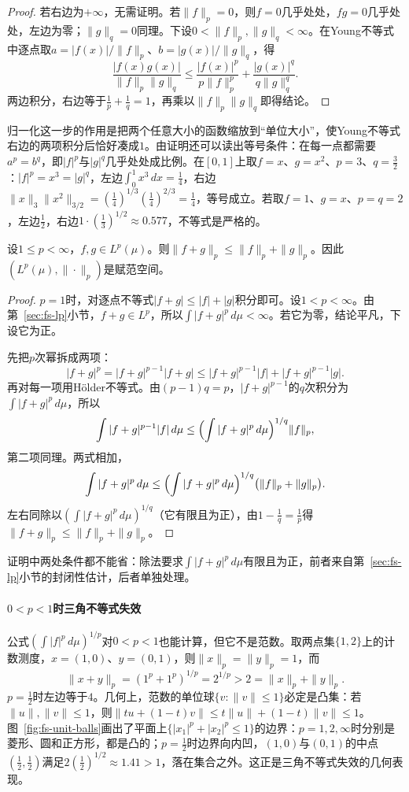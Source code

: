 \begin{proof}
若右边为$+\infty$，无需证明。若$\|f\|_p=0$，则$f=0$几乎处处，$fg=0$几乎处处，左边为零；$\|g\|_q=0$同理。下设$0<\|f\|_p,\|g\|_q<\infty$。在Young不等式中逐点取$a=|f(x)|/\|f\|_p$、$b=|g(x)|/\|g\|_q$，得
\[
 \frac{|f(x)g(x)|}{\|f\|_p\|g\|_q}\leq\frac{|f(x)|^p}{p\|f\|_p^p}+\frac{|g(x)|^q}{q\|g\|_q^q}.
\]
两边积分，右边等于$\tfrac1p+\tfrac1q=1$，再乘以$\|f\|_p\|g\|_q$即得结论。
\end{proof}

归一化这一步的作用是把两个任意大小的函数缩放到“单位大小”，使Young不等式右边的两项积分后恰好凑成$1$。由证明还可以读出等号条件：在每一点都需要$a^p=b^q$，即$|f|^p$与$|g|^q$几乎处处成比例。在$[0,1]$上取$f=x$、$g=x^2$、$p=3$、$q=\tfrac32$：$|f|^p=x^3=|g|^q$，左边$\int_0^1x^3\,dx=\tfrac14$，右边$\|x\|_3\|x^2\|_{3/2}=(\tfrac14)^{1/3}(\tfrac14)^{2/3}=\tfrac14$，等号成立。若取$f=1$、$g=x$、$p=q=2$，左边$\tfrac12$，右边$1\cdot(\tfrac13)^{1/2}\approx0.577$，不等式是严格的。

\begin{theorem}[Minkowski不等式]
\label{thm:fs-minkowski}
设$1\leq p<\infty$，$f,g\in L^p(\mu)$。则$\|f+g\|_p\leq\|f\|_p+\|g\|_p$。因此$(L^p(\mu),\|\cdot\|_p)$是赋范空间。
\end{theorem}

\begin{proof}
$p=1$时，对逐点不等式$|f+g|\leq|f|+|g|$积分即可。设$1<p<\infty$。由第~\ref{sec:fs-lp}小节，$f+g\in L^p$，所以$\int|f+g|^p\,d\mu<\infty$。若它为零，结论平凡，下设它为正。

先把$p$次幂拆成两项：
\[
 |f+g|^p=|f+g|^{p-1}|f+g|\leq|f+g|^{p-1}|f|+|f+g|^{p-1}|g| .
\]
再对每一项用Hölder不等式。由$(p-1)q=p$，$|f+g|^{p-1}$的$q$次积分为$\int|f+g|^p\,d\mu$，所以
\[
 \int|f+g|^{p-1}|f|\,d\mu\leq\Bigl(\int|f+g|^p\,d\mu\Bigr)^{1/q}\|f\|_p ,
\]
第二项同理。两式相加，
\[
 \int|f+g|^p\,d\mu\leq\Bigl(\int|f+g|^p\,d\mu\Bigr)^{1/q}\bigl(\|f\|_p+\|g\|_p\bigr).
\]
左右同除以$(\int|f+g|^p\,d\mu)^{1/q}$（它有限且为正），由$1-\tfrac1q=\tfrac1p$得$\|f+g\|_p\leq\|f\|_p+\|g\|_p$。
\end{proof}

证明中两处条件都不能省：除法要求$\int|f+g|^p\,d\mu$有限且为正，前者来自第~\ref{sec:fs-lp}小节的封闭性估计，后者单独处理。

\paragraph{$0<p<1$时三角不等式失效}
公式$(\int|f|^p\,d\mu)^{1/p}$对$0<p<1$也能计算，但它不是范数。取两点集$\{1,2\}$上的计数测度，$x=(1,0)$、$y=(0,1)$，则$\|x\|_p=\|y\|_p=1$，而
\[
 \|x+y\|_p=(1^p+1^p)^{1/p}=2^{1/p}>2=\|x\|_p+\|y\|_p .
\]
$p=\tfrac12$时左边等于$4$。几何上，范数的单位球$\{v:\|v\|\leq1\}$必定是凸集：若$\|u\|,\|v\|\leq1$，则$\|tu+(1-t)v\|\leq t\|u\|+(1-t)\|v\|\leq1$。图~\ref{fig:fs-unit-balls}画出了平面上$\{|x_1|^p+|x_2|^p\leq1\}$的边界：$p=1,2,\infty$时分别是菱形、圆和正方形，都是凸的；$p=\tfrac12$时边界向内凹，$(1,0)$与$(0,1)$的中点$(\tfrac12,\tfrac12)$满足$2(\tfrac12)^{1/2}\approx1.41>1$，落在集合之外。这正是三角不等式失效的几何表现。

